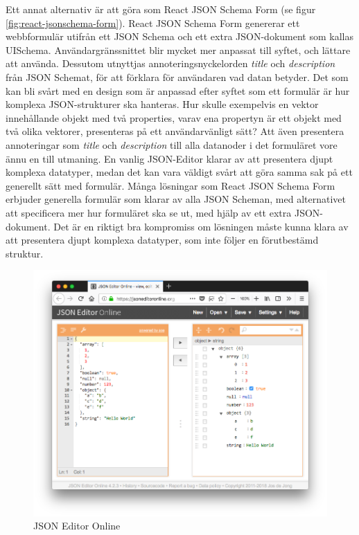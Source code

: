 Ett annat alternativ är att göra som React JSON Schema Form (se figur \ref{fig:react-jsonschema-form}). React JSON Schema Form genererar ett webbformulär utifrån ett JSON Schema och ett extra JSON-dokument som kallas UISchema. \cite{MozillaServices} Användargränssnittet blir mycket mer anpassat till syftet, och lättare att använda. Dessutom utnyttjas annoteringsnyckelorden \textit{title} och \textit{description} från JSON Schemat, för att förklara för användaren vad datan betyder. Det som kan bli svårt med en design som är anpassad efter syftet som ett formulär är hur komplexa JSON-strukturer ska hanteras. Hur skulle exempelvis en vektor innehållande objekt med två properties, varav ena propertyn är ett objekt med två olika vektorer, presenteras på ett användarvänligt sätt? Att även presentera annoteringar som \textit{title} och \textit{description} till alla datanoder i det formuläret vore ännu en till utmaning. En vanlig JSON-Editor klarar av att presentera djupt komplexa datatyper, medan det kan vara väldigt svårt att göra samma sak på ett generellt sätt med formulär. Många lösningar som React JSON Schema Form erbjuder generella formulär som klarar av alla JSON Scheman, med alternativet att specificera mer hur formuläret ska se ut, med hjälp av ett extra JSON-dokument. \cite{MozillaServices} Det är en riktigt bra kompromiss om lösningen måste kunna klara av att presentera djupt komplexa datatyper, som inte följer en förutbestämd struktur.

\begin{figure}
	\includegraphics[width=\textwidth]{./images/screenshot-json-editor.png}
	\caption{JSON Editor Online \cite{DeJong2018}}
	\label{fig:json-editor}
\end{figure}

